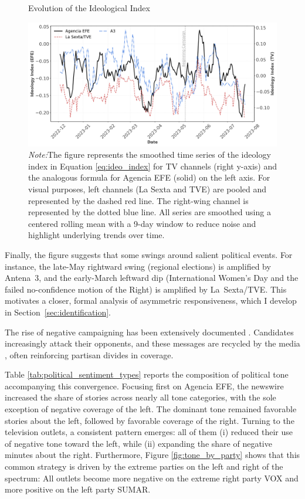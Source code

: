\documentclass[12pt]{article}
\begin{document}
\begin{figure}[!htb]
	\caption{Evolution of the Ideological Index}
	\centering
	\includegraphics[width=150mm]{figures/tv_vs_efe_net_diff}
	\caption*{\small \textit{Note:}The figure represents the smoothed time series of the ideology index in Equation \ref{eq:ideo_index} for TV channels (right y-axis) and the analogous formula for Agencia EFE (solid) on the left axis. For visual purposes, left channels (La Sexta and TVE) are pooled and represented by the dashed red line. The right-wing channel is represented by the dotted blue line. All series are smoothed using a centered rolling mean with a 9-day window to reduce noise and highlight underlying trends over time.}
	\label{fig:net_tone}
\end{figure}

Finally, the figure suggests that some swings around salient political events. For instance,  the late-May rightward swing (regional elections) is amplified by Antena~3, and the early-March leftward dip (International Women’s Day and the failed no-confidence motion of the Right) is amplified by La~Sexta/TVE.  This motivates a closer, formal analysis of asymmetric responsiveness, which I develop in Section~\ref{sec:identification}.



The rise of negative campaigning has been extensively documented \citep{lau2009negative}. Candidates increasingly attack their opponents, and these messages are recycled by the media \citep{iyengar_affective}, often reinforcing partisan divides in coverage.

Table \ref{tab:political_sentiment_types} reports the composition of political tone accompanying this convergence. Focusing first on Agencia EFE, the newswire increased the share of stories across nearly all tone categories, with the sole exception of negative coverage of the left. The dominant tone remained favorable stories about the left, followed by favorable coverage of the right. Turning to the television outlets, a consistent pattern emerges: all of them (i) reduced their use of negative tone toward the left, while (ii) expanding the share of negative minutes about the right. Furthermore, Figure \ref{fig:tone_by_party} shows that this common strategy is driven by the extreme parties on the left and right of the spectrum: All outlets become more negative on the extreme right party VOX and more positive on the left party SUMAR.
\end{document}
